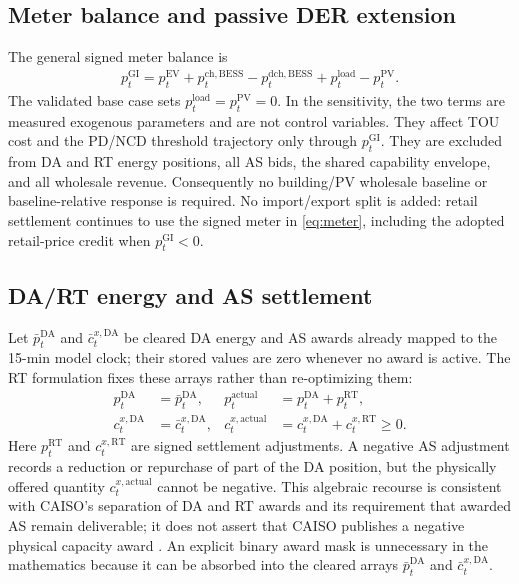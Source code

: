\documentclass[final,5p,times]{elsarticle}
\newcommand{\EV}{\mathrm{EV}}
\newcommand{\BESS}{\mathrm{BESS}}
\newcommand{\DA}{\mathrm{DA}}
\newcommand{\RT}{\mathrm{RT}}
\newcommand{\GI}{\mathrm{GI}}
\newcommand{\PV}{\mathrm{PV}}
\newcommand{\ch}{\mathrm{ch}}
\newcommand{\dch}{\mathrm{dch}}
\newcommand{\actual}{\mathrm{actual}}
\newcommand{\load}{\mathrm{load}}
\begin{document}
\subsection{Meter balance and passive DER extension}
\label{sec:passive_der}
The general signed meter balance is
\begin{align}
p_t^{\GI}
=p_t^{\EV}+p_t^{\ch,\BESS}-p_t^{\dch,\BESS}
+p_t^{\load}-p_t^{\PV}. \label{eq:meter}
\end{align}
The validated base case sets $p_t^{\load}=p_t^{\PV}=0$. In the sensitivity,
the two terms are measured exogenous parameters and are not control variables.
They affect TOU cost and the PD/NCD threshold trajectory only through
$p_t^{\GI}$. They are excluded from DA and RT energy positions, all AS bids,
the shared capability envelope, and all wholesale revenue. Consequently no
building/PV wholesale baseline or baseline-relative response is required.
No import/export split is added: retail settlement continues to use the signed
meter in \eqref{eq:meter}, including the adopted retail-price credit when
$p_t^{\GI}<0$.

\subsection{DA/RT energy and AS settlement}
Let $\bar p_t^{\DA}$ and $\bar c_t^{x,\DA}$ be cleared DA energy and AS awards
already mapped to the 15-min model clock; their stored values are zero whenever
no award is active. The RT formulation fixes these arrays rather than
re-optimizing them:
\begin{align}
p_t^{\DA}&=\bar p_t^{\DA},&
p_t^{\actual}&=p_t^{\DA}+p_t^{\RT}, \label{eq:actual_energy}\\
c_t^{x,\DA}&=\bar c_t^{x,\DA},&
c_t^{x,\actual}&=c_t^{x,\DA}+c_t^{x,\RT}\ge0. \label{eq:actual_as}
\end{align}
Here $p_t^{\RT}$ and $c_t^{x,\RT}$ are signed settlement adjustments. A
negative AS adjustment records a reduction or repurchase of part of the DA
position, but the physically offered quantity $c_t^{x,\actual}$ cannot be
negative. This algebraic recourse is consistent with CAISO's separation of DA
and RT awards and its requirement that awarded AS remain deliverable; it does
not assert that CAISO publishes a negative physical capacity award
\cite{caisoMarketOperations2026} \cite{caisoNGRCommitment2020}. An explicit binary
award mask is unnecessary in the mathematics because it can be absorbed into
the cleared arrays $\bar p_t^{\DA}$ and $\bar c_t^{x,\DA}$.
\end{document}
